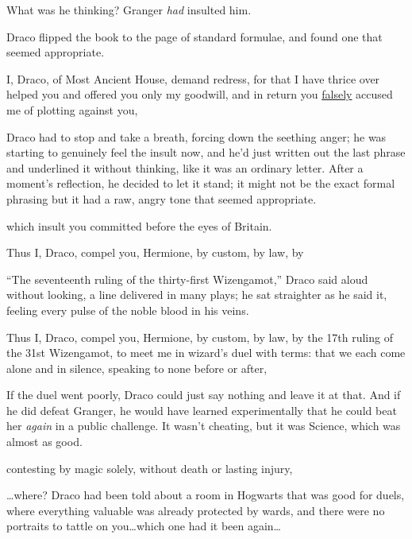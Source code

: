 What was he thinking? Granger \emph{had} insulted him.

Draco flipped the book to the page of standard formulae, and found one that seemed appropriate.

\begin{writtenNote}
I, Draco, of Most Ancient House, demand redress, for that I have thrice over helped you and offered you only my goodwill, and in return you \underline{falsely} accused me of plotting against you, \end{writtenNote}

Draco had to stop and take a breath, forcing down the seething anger; he was starting to genuinely feel the insult now, and he’d just written out the last phrase and underlined it without thinking, like it was an ordinary letter. After a moment’s reflection, he decided to let it stand; it might not be the exact formal phrasing but it had a raw, angry tone that seemed appropriate.

\begin{writtenNote}
which insult you committed before the eyes of Britain.

Thus I, Draco, compel you, Hermione, by custom, by law, by
\end{writtenNote}

“The seventeenth ruling of the thirty-first Wizengamot,” Draco said aloud without looking, a line delivered in many plays; he sat straighter as he said it, feeling every pulse of the noble blood in his veins.

\begin{writtenNote}
Thus I, Draco, compel you, Hermione, by custom, by law, by the 17th ruling of the 31st Wizengamot, to meet me in wizard’s duel with terms: that we each come alone and in silence, speaking to none before or after, \end{writtenNote}

If the duel went poorly, Draco could just say nothing and leave it at that. And if he did defeat Granger, he would have learned experimentally that he could beat her \emph{again} in a public challenge. It wasn’t cheating, but it was Science, which was almost as good.

\begin{writtenNote}
contesting by magic solely, without death or lasting injury,
\end{writtenNote}

…where? Draco had been told about a room in Hogwarts that was good for duels, where everything valuable was already protected by wards, and there were no portraits to tattle on you…which one had it been again…


